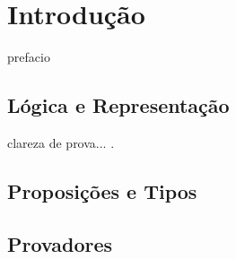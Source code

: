 \chapter{Introdução}

prefacio

\section{Lógica e Representação}

clareza de prova... \cite{enderton2001}.

\section{Proposições e Tipos}

\section{Provadores}



